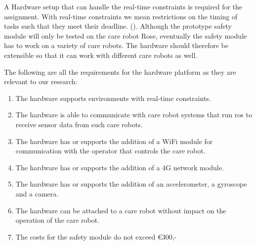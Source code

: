 \documentclass[12pt]{scrreprt}
\begin{document}
A Hardware setup that can handle the real-time constraints is required for the assignment. With real-time constraints we mean restrictions on the timing of tasks such that they meet their deadline. (\cite{real-time_constraints}). Although the prototype safety module will only be tested on the care robot Rose, eventually the safety module has to work on a variety of care robots. The hardware should therefore be extensible so that it can work with different care robots as well.
\par
The following are all the requirements for the hardware platform as they are relevant to our research:

\begin{enumerate}
    \item The hardware supports environments with real-time constraints. \label{hsOne}
    \item The hardware is able to communicate with care robot systems that run \acrlong{ros} to receive sensor data from such care robots. \label{hsTwo}
    \item The hardware has or supports the addition of a WiFi module for communication with the operator that controls the care robot. \label{hsThree}
    \item The hardware has or supports the addition of a 4G network module. \label{hsFour}
    \item The hardware has or supports the addition of an accelerometer, a gyroscope and a camera. \label{hsFive}
    \item The hardware can be attached to a care robot without impact on the operation of the care robot. \label{hsSix}
    \item The costs for the safety module do not exceed €300,- \label{hsSeven}
\end{enumerate}
\end{document}
